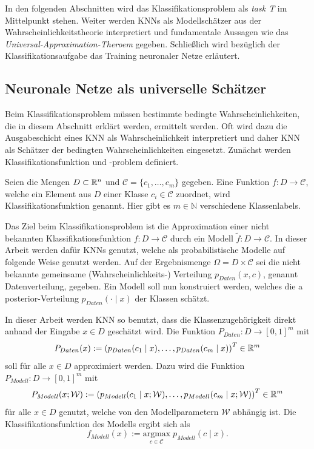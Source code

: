 In den folgenden Abschnitten wird das Klassifikationsproblem als \textit{task T} im Mittelpunkt stehen. Weiter werden KNNs als Modellschätzer aus der Wahrscheinlichkeitstheorie interpretiert und fundamentale Aussagen wie das \textit{Universal-Approximation-Theroem}\cite{HORNIK1989359} gegeben. Schließlich wird bezüglich der Klassifikationsaufgabe das Training neuronaler Netze erläutert.


\subsection{Neuronale Netze als universelle Schätzer}
\label{NN_estimators_abs}
Beim Klassifikationsproblem müssen bestimmte bedingte Wahrscheinlichkeiten, die in diesem Abschnitt erklärt werden, ermittelt werden. Oft wird dazu die Ausgabeschicht eines KNN als Wahrscheinlichkeit interpretiert und daher KNN als Schätzer der bedingten Wahrscheinlichkeiten eingesetzt. Zunächst werden Klassifikationsfunktion und -problem definiert.
\begin{defi}
    \label{def_classfun}
    Seien die Mengen $D \subset \mathbb{R}^n$ und $\mathcal{C}=\{c_1, \ldots, c_m\}$ gegeben. Eine Funktion $f: D \rightarrow \mathcal{C}$, welche ein Element aus $D$ einer Klasse $c_i \in \mathcal{C}$ zuordnet, wird Klassifikationsfunktion genannt. Hier gibt es $m \in \mathbb{N}$ verschiedene Klassenlabels.
\end{defi}

Das Ziel beim Klassifikationsproblem ist die Approximation einer nicht bekannten Klassifikationsfunktion $f:D \rightarrow \mathcal{C}$ durch ein Modell $\tilde{f}: D \rightarrow \mathcal{C}$. 
In dieser Arbeit werden dafür KNNs genutzt, welche als probabilistische Modelle auf folgende Weise genutzt werden. Auf der Ergebnismenge $\Omega= D \times \mathcal{C}$ sei die nicht bekannte gemeinsame (Wahrscheinlichkeits-) Verteilung $p_{Daten}(x,c)$, genannt Datenverteilung, gegeben. Ein Modell soll nun konstruiert werden, welches die a posterior-Verteilung $p_{Daten}(\cdot \; | \; x)$ der Klassen schätzt. 

In dieser Arbeit werden KNN so benutzt, dass die Klassenzugehörigkeit direkt anhand der Eingabe $x \in D$ geschätzt wird. Die Funktion $P_{Daten}: D \rightarrow [0,1]^m$ mit
\begin{equation}
    \label{eq:Pdaten}
    P_{Daten}(x):=\left(p_{Daten}(c_1 \; | \; x), \ldots, p_{Daten}(c_m \; | \; x)\right)^T \in \mathbb{R}^m
\end{equation} soll für alle $x \in D$ approximiert werden. Dazu wird die Funktion $P_{Modell}: D \rightarrow [0,1]^m$ mit 
\begin{equation}
    \label{eq:Pmodell}
    P_{Modell}(x;\mathcal{W}):=\left(p_{Modell}(c_1 \; | \; x; \mathcal{W}), \ldots, p_{Modell}(c_m \; | \; x; \mathcal{W})\right)^T \in \mathbb{R}^m
\end{equation}
 für alle $x \in D$  genutzt, welche von den Modellparametern $\mathcal{W}$ abhängig ist. Die Klassifikationsfunktion des Modells ergibt sich als
\begin{equation}
    \label{eq:f_modell}
    f_{Modell}(x):= \underset{c \in \mathcal{C}}{\mathrm{argmax}} \; p_{Modell}(c \; | \; x).
\end{equation}

